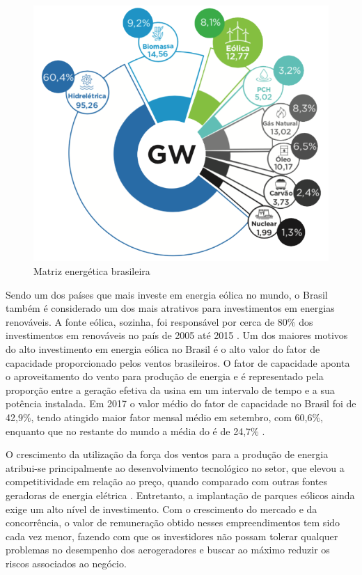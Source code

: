 \begin{figure}[htbp!] \begin{center}
\includegraphics[width=0.65\linewidth]{./figuras/matriz-energetica-brasileira}
\caption{Matriz energética brasileira}
\label{Fig:matriz-energetica-brasileira}
\end{center} 
\end{figure}

Sendo um dos países que mais investe em energia eólica no mundo, o Brasil também é considerado um dos mais atrativos para investimentos em energias renováveis. A fonte eólica, sozinha, foi responsável por cerca de 80\% dos investimentos em renováveis no país de 2005 até 2015 \cite{CENARIO}. Um dos maiores motivos do alto investimento em energia eólica no Brasil é o alto valor do fator de capacidade proporcionado pelos ventos brasileiros. O fator de capacidade aponta o aproveitamento do vento para produção de energia e é representado pela proporção entre a geração efetiva da usina em um intervalo de tempo e a sua potência instalada. Em 2017 o valor médio do fator de capacidade no Brasil foi de 42,9\%, tendo atingido maior fator mensal médio em setembro, com 60,6\%, enquanto que no restante do mundo a média do é de 24,7\% \cite{boletim-anual-geracao-2017}.

O crescimento da utilização da força dos ventos para a produção de energia atribui-se principalmente ao desenvolvimento tecnológico no setor, que elevou a competitividade em relação ao preço, quando comparado com outras fontes geradoras de energia elétrica \cite{matrizes-energeticas-brasil}. Entretanto, a implantação de parques eólicos ainda exige um alto nível de investimento. Com o crescimento do mercado e da concorrência, o valor de remuneração obtido nesses empreendimentos tem sido cada vez menor, fazendo com que os investidores não possam tolerar qualquer problemas no desempenho dos aerogeradores e buscar ao máximo reduzir os riscos associados ao negócio.

